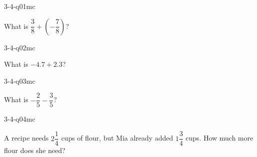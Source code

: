 

\begin{practiceQuestion}{3-4-q01}{mc}
\begin{questionText}
What is $\dfrac{3}{8} + \left(-\dfrac{7}{8}\right)$?
\end{questionText}
\end{practiceQuestion}

\begin{practiceQuestion}{3-4-q02}{mc}
\begin{questionText}
What is $-4.7 + 2.3$?
\end{questionText}
\end{practiceQuestion}

\begin{practiceQuestion}{3-4-q03}{mc}
\begin{questionText}
What is $-\dfrac{2}{5} - \dfrac{3}{5}$?
\end{questionText}
\end{practiceQuestion}

\begin{practiceQuestion}{3-4-q04}{mc}
\begin{questionText}
A recipe needs $2\dfrac{1}{4}$ cups of flour, but Mia already added $1\dfrac{3}{4}$ cups. How much more flour does she need?
\end{questionText}
\end{practiceQuestion}

